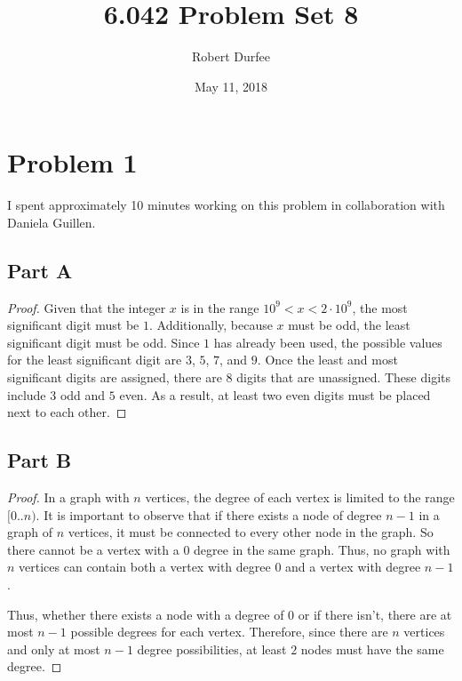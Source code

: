\documentclass{article}
\title{6.042 Problem Set 8}
\author{Robert Durfee}
\date{May 11, 2018}
\begin{document}
\maketitle

\section*{Problem 1}

I spent approximately 10 minutes working on this problem in collaboration with
Daniela Guillen.

\subsection*{Part A}

\begin{proof}

  Given that the integer $x$ is in the range $10^9 < x < 2 \cdot 10^9$, the most
  significant digit must be $1$. Additionally, because $x$ must be odd, the
  least significant digit must be odd. Since $1$ has already been used,
  the possible values for the least significant digit are $3$, $5$, $7$, and
  $9$. Once the least and most significant digits are assigned, there are 8
  digits that are unassigned. These digits include $3$ odd and $5$ even. As a
  result, at least two even digits must be placed next to each other.

\end{proof}

\break

\subsection*{Part B}

\begin{proof}

  In a graph with $n$ vertices, the degree of each vertex is limited to the
  range $[0..n)$. It is important to observe that if there exists a node of
  degree $n-1$ in a graph of $n$ vertices, it must be connected to every other
  node in the graph. So there cannot be a vertex with a $0$ degree in the
  same graph. Thus, no graph with $n$ vertices can contain both a vertex
  with degree $0$ and a vertex with degree $n-1$.

  Thus, whether there exists a node with a degree of $0$ or if there isn't,
  there are at most $n - 1$ possible degrees for each vertex. Therefore, since
  there are $n$ vertices and only at most $n - 1$ degree possibilities, at least
  $2$ nodes must have the same degree.

\end{proof}
\end{document}

